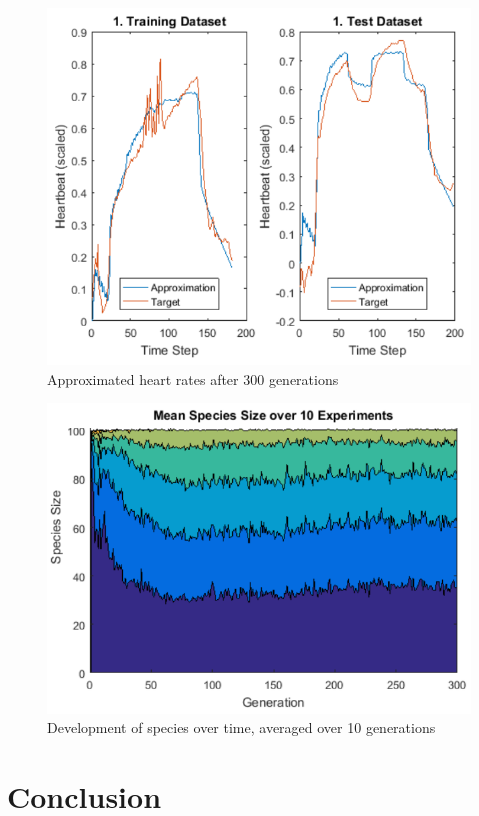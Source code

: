 \documentclass{hbrs-ecta-report}
\begin{document}
\begin{figure}[ht!]
\centering
\includegraphics[width=\linewidth]{img/5.png}
\caption{Approximated heart rates after 300 generations}
\label{fig:5} 
\end{figure}

\begin{figure}[ht!]
\centering
\includegraphics[width=\linewidth]{img/6.png}
\caption{Development of species over time, averaged over 10 generations}
\label{fig:6} 
\end{figure}


\FloatBarrier
\section{Conclusion}



 
\end{document}
